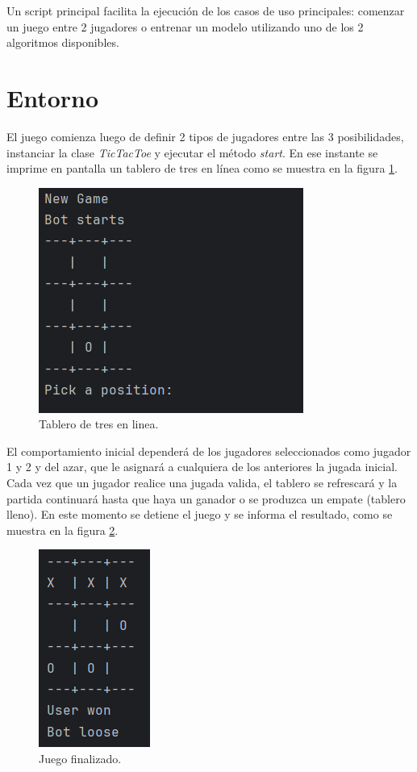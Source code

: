 Un script principal facilita la ejecución de los casos de uso principales: comenzar un juego entre 2 jugadores o entrenar un modelo utilizando uno de los 2 algoritmos disponibles.

\section{Entorno}

El juego comienza luego de definir 2 tipos de jugadores entre las 3 posibilidades, instanciar la clase \textit{TicTacToe} y ejecutar el método \textit{start}. En ese instante se imprime en pantalla un tablero de tres en línea como se muestra en la figura \ref{fig:board}. 

\begin{figure}[htbp]
	\centering
	\includegraphics[width=.5\textwidth]{./Figures/board.png}
	\caption{Tablero de tres en linea.}
	\label{fig:board}
\end{figure}

El comportamiento inicial dependerá de los jugadores seleccionados como jugador 1 y 2 y del azar, que le asignará a cualquiera de los anteriores la jugada inicial. Cada vez que un jugador realice una jugada valida, el tablero se refrescará y la partida continuará hasta que haya un ganador o se produzca un empate (tablero lleno). En este momento se detiene el juego y se informa el resultado, como se muestra en la figura \ref{fig:board_end}.

\begin{figure}[htbp]
	\centering
	\includegraphics[width=.25\textwidth]{./Figures/board_end.png}
	\caption{Juego finalizado.}
	\label{fig:board_end}
\end{figure}

